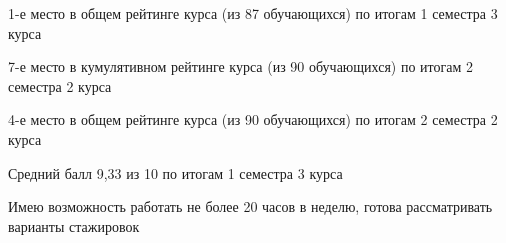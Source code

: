 

\begin{cventries}

\cventry
{} 
{}
{}
{} 
{
 \begin{cvitems}
\item {1-е место в общем рейтинге курса (из 87 обучающихся) по итогам 1 семестра 3 курса}
\item {7-е место в кумулятивном рейтинге курса (из 90 обучающихся) по итогам 2 семестра 2 курса}
\item {4-е место в общем рейтинге курса (из 90 обучающихся) по итогам 2 семестра 2 курса}
\item {Средний балл 9,33 из 10 по итогам 1 семестра 3 курса}
\item {Имею возможность работать не более 20 часов в неделю, готова рассматривать варианты стажировок}
 \end{cvitems}
}

\end{cventries}